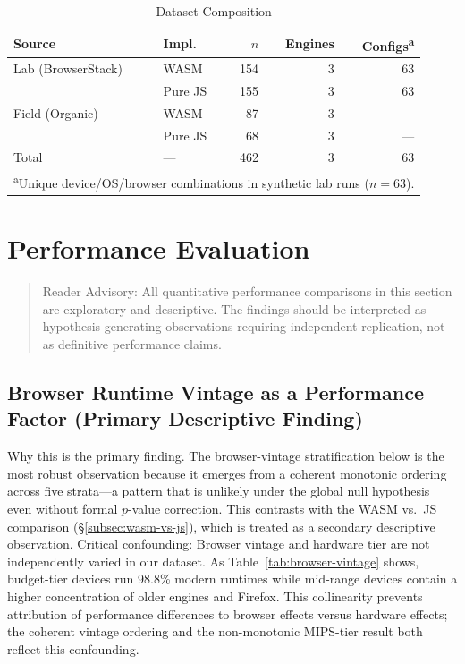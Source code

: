 \documentclass[11pt,a4paper]{article}
\def\textbf#1{#1}%
\begin{document}
\begin{table}[htbp]
\centering
\caption{Dataset Composition}
\label{tab:dataset}
\begin{tabular}{@{}llrrr@{}}
\toprule
\textbf{Source} & \textbf{Impl.} & \textbf{$n$} & \textbf{Engines} & \textbf{Configs\textsuperscript{a}} \\
\midrule
Lab (BrowserStack)
    & WASM    & 154  & 3 & 63 \\
    & Pure JS & 155  & 3 & 63 \\
\midrule
Field (Organic)
    & WASM    & 87   & 3 & --- \\
    & Pure JS & 68   & 3 & --- \\
\midrule
\textbf{Total} & --- & \textbf{462} & \textbf{3} & \textbf{63} \\
\bottomrule
\multicolumn{5}{l}{\textsuperscript{a}\footnotesize{Unique device/OS/browser combinations in synthetic lab runs ($n=63$).}}
\end{tabular}
\end{table}

\section{Performance Evaluation}
\label{sec:performance}

\begin{quote}
\textbf{Reader Advisory:} All quantitative performance comparisons in this section are exploratory and descriptive. The findings should be interpreted as hypothesis-generating observations requiring independent replication, not as definitive performance claims.
\end{quote}

\subsection{Browser Runtime Vintage as a Performance Factor (Primary Descriptive Finding)}
\label{subsec:tiers}

\textbf{Why this is the primary finding.} The browser-vintage stratification below is the most robust observation because it emerges from a coherent monotonic ordering across five strata---a pattern that is unlikely under the global null hypothesis even without formal $p$-value correction. This contrasts with the WASM vs.\ JS comparison (\S\ref{subsec:wasm-vs-js}), which is treated as a secondary descriptive observation. \textbf{Critical confounding:} Browser vintage and hardware tier are not independently varied in our dataset. As Table~\ref{tab:browser-vintage} shows, budget-tier devices run 98.8\% modern runtimes while mid-range devices contain a higher concentration of older engines and Firefox. This collinearity prevents attribution of performance differences to browser effects versus hardware effects; the coherent vintage ordering and the non-monotonic MIPS-tier result both reflect this confounding.
\end{document}
